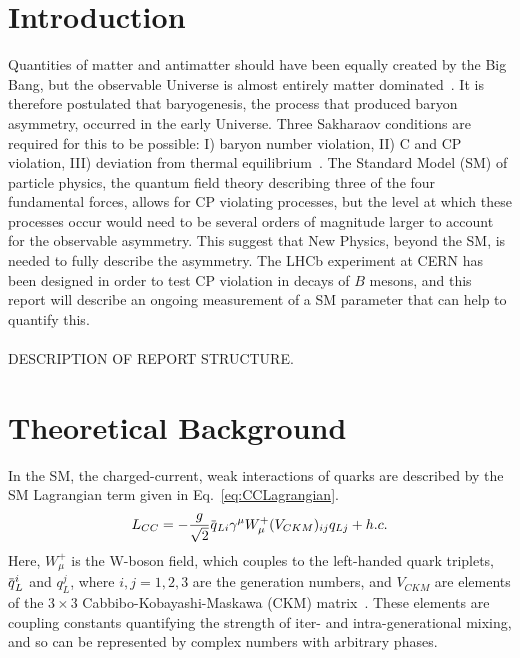 \documentclass[oneside,12pt]{article}
\newcommand{\overbar}[1]{\mkern 1.5mu\overline{\mkern-1.5mu#1\mkern-1.5mu}\mkern 1.5mu}
\begin{document}
\section{\normalsize Introduction}
Quantities of matter and antimatter should have been equally created by the Big
Bang, but the observable Universe is almost entirely matter
dominated~\cite{UniAsymmetry}. It is therefore postulated that baryogenesis, the
process that produced baryon asymmetry, occurred in the early Universe. Three
Sakharaov conditions are required for this to be possible: I) baryon number
violation, II) C and CP violation, III) deviation from thermal
equilibrium~\cite{Sakharov}. The Standard Model (SM) of particle physics, the
quantum field theory describing three of the four fundamental forces, allows for
CP violating processes, but the level at which these processes occur would need
to be several orders of magnitude larger to account for the observable
asymmetry. This suggest that New Physics, beyond the SM, is needed to fully
describe the asymmetry. The LHCb experiment at CERN has been designed in order
to test CP violation in decays of $B$ mesons, and this report will describe an
ongoing measurement of a SM parameter that can help to quantify this. \\ 
\\
DESCRIPTION OF REPORT STRUCTURE.
\section{\normalsize Theoretical Background}
In the SM, the charged-current, weak interactions of quarks are described by the
SM Lagrangian term given in Eq.~\eqref{eq:CCLagrangian}.
\begin{equation}
  L_{CC}=-\frac{g}{\sqrt{2}}\overbar{q}_{Li}\gamma^{\mu}W_{\mu}^{+}(V_{CKM})_{ij}q_{Lj} + h.c.
  \label{eq:CCLagrangian}
\end{equation}
\noindent Here, $W_{\mu}^{+}$ is the W-boson field, which couples to the
left-handed quark triplets, $\overbar{q}_{L}^{i}$ and $q_{L}^{j}$, where
$i,j=1,2,3$ are the generation numbers, and $V_{CKM}$ are elements of the
$3\times 3$ Cabbibo-Kobayashi-Maskawa (CKM) matrix~\cite{CKMTheory}. These
elements are coupling constants quantifying the strength of iter- and
intra-generational mixing, and so can be represented by complex numbers with
arbitrary phases.
\end{document}

